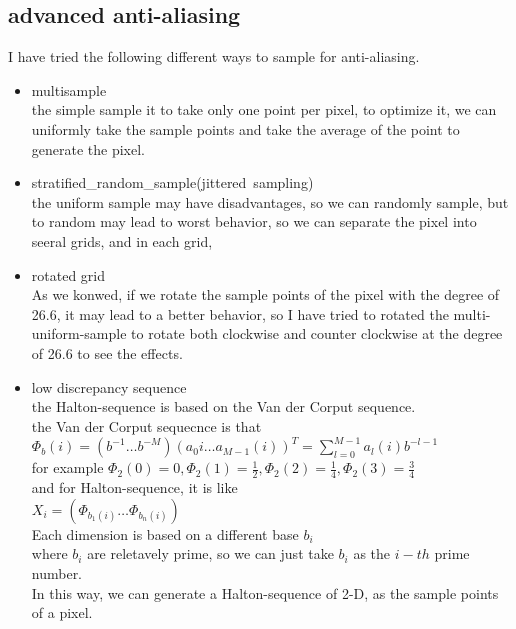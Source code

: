\documentclass[acmtog]{acmart}
\begin{document}
\subsection{advanced anti-aliasing}
I have tried the following different ways to sample for anti-aliasing.\\
\begin{itemize}
	\item multisample
		\\the simple sample it to take only one point per pixel, to optimize it, we can uniformly take the sample points and 
		take the average of the point to generate the pixel.
	\item stratified\_random\_sample(jittered\ sampling)
		\\
		the uniform sample may have disadvantages, so we can randomly sample,
		but to random may lead to worst behavior, so we can separate the pixel into seeral grids, and in each grid,

	\item rotated grid
		\\As we konwed, if we rotate the sample points of the pixel with the degree of 26.6, it may lead to a better behavior,
		so I have tried to rotated the multi-uniform-sample to rotate both clockwise and counter clockwise at the degree of 26.6 to see the effects.
	\item low discrepancy sequence 
		\\the Halton-sequence is based on the Van der Corput sequence.\\
		the Van der Corput sequecnce is that\\
		$\Phi_b(i) = (b^{-1}\dots b^{-M})(a_0{i}\dots a_{M-1}(i))^T = \sum_{l=0}^{M-1}a_l(i)b^{-l-1}$\\
	for example $\Phi_2(0) = 0, \Phi_2(1) = \frac{1}{2}, \Phi_2(2) = \frac{1}{4}, \Phi_2(3) = \frac{3}{4}$\\

	and for Halton-sequence, it is like\\
	$X_i = (\Phi_{b_1(i)}\dots \Phi_{b_n(i)})$\\
	Each dimension is based on a different base $b_i$\\
	where $b_i$ are reletavely prime, so we can just take $b_i$ as the $i-th$ prime number.\\
	In this way, we can generate a Halton-sequence of 2-D, as the sample points of a pixel.

\end{itemize}
\end{document}
